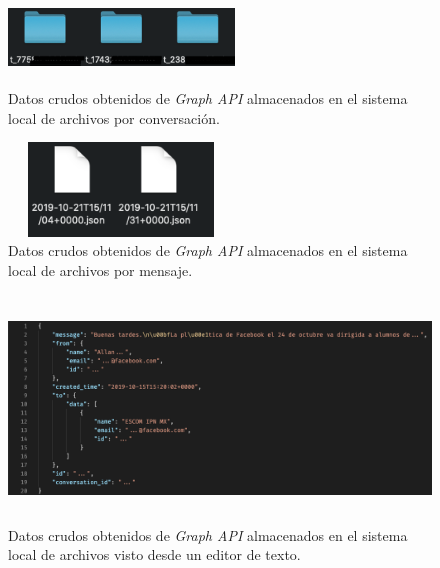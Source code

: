     \begin{multicols}{2}
        \begin{figure}[H]
             \centering
             \includegraphics[height=2.5cm, width=6cm]{Latex/Classes/Imagenes/almacenamiento-local.png}
             \caption{Datos crudos obtenidos de \textit{Graph API} almacenados en el sistema local de archivos por conversación.}
             \label{fig:almacenamiento-local-conversacion}
        \end{figure}
        
        \begin{figure}[H]
             \centering
             \includegraphics[height=2.5cm, width=6cm]{Latex/Classes/Imagenes/conversacion-local.png}
             \caption{Datos crudos obtenidos de \textit{Graph API} almacenados en el sistema local de archivos por mensaje.}
             \label{fig:almacenamiento-local-mensaje}
        \end{figure}
    \end{multicols}
    \begin{figure}[H]
         \centering
         \includegraphics[height=6cm, width=16.5cm]{Latex/Classes/Imagenes/conversacion-local-vista.png}
         \caption{Datos crudos obtenidos de \textit{Graph API} almacenados en el sistema local de archivos visto desde un editor de texto.}
         \label{fig:almacenamiento-local-mensaje-editor}
    \end{figure}
    
